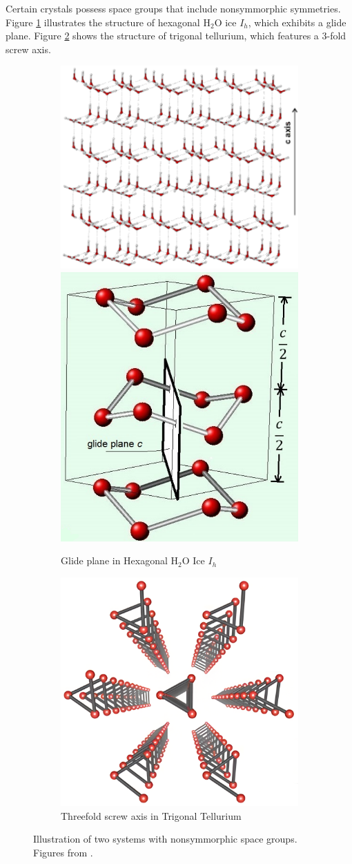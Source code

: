 Certain crystals possess space groups that include nonsymmorphic symmetries. Figure \ref{fig:hexagonal_ice_glideplane_a} illustrates the structure of hexagonal H$_2$O ice $I_h$, which exhibits a glide plane. Figure \ref{fig:tellurium_screwaxis_b} shows the structure of trigonal tellurium, which features a $3$-fold screw axis.
\begin{figure}[H]
\centering
\begin{subfigure}{.5\textwidth}
  \centering
  \includegraphics[height=.4\linewidth]{fig/hexagonal_ice_lattice.png}
  \includegraphics[height=.4\linewidth]{fig/hexagonal_ice_glide_plane.png}
  \caption{Glide plane in Hexagonal H$_2$O Ice $I_h$}
  \label{fig:hexagonal_ice_glideplane_a}
\end{subfigure}%
\begin{subfigure}{.5\textwidth}
  \centering
  \includegraphics[height=.4\linewidth]{fig/tellurium_screw_axis_enhanced.png}  %
  \caption{Threefold screw axis in Trigonal Tellurium}
  \label{fig:tellurium_screwaxis_b}
\end{subfigure}
\caption{Illustration of two systems with nonsymmorphic space groups. Figures from \cite{hexagonal_ice_fig_spacegroup_wiki, hexagonal_ice_water_structure_and_science, tellurium_fig_screw_axis}.}
\label{fig:nonsymmorphic_real_systems}
\end{figure}

